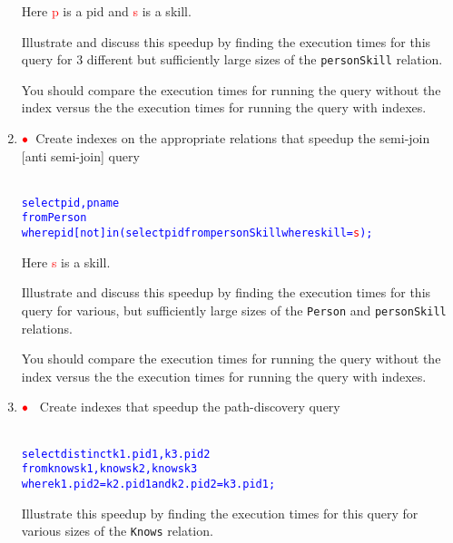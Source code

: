 \documentclass{article}
\newcommand{\redbullet}{$\textcolor{red}{\bullet}$}
\newcommand{\red}[1]{\textcolor{red}#1}
\begin{document}
\begin{enumerate}[resume]
Here \textcolor{red}{p} is a pid and \textcolor{red}{s} is a skill.

Illustrate and discuss this speedup by finding the execution times for this query for  
3 different but sufficiently large sizes of the {\tt personSkill} relation.

You should compare the execution times for running the query without the index versus the
the execution times for running the query with indexes.

\item \redbullet\  Create indexes on the appropriate relations that speedup the semi-join [anti semi-join] query
\begin{alltt}\textcolor{blue}{
select pid, pname 
from   Person 
where  pid [not] in (select pid from personSkill where skill = \red{s});}
\end{alltt}

Here \textcolor{red}{s} is a skill.

Illustrate and discuss this speedup by finding the execution times for this query for 
various, but sufficiently large sizes of the {\tt Person} and {\tt personSkill} relations.

You should compare the execution times for running the query without the index versus the
the execution times for running the query with indexes.

\item \redbullet\ %
Create indexes that speedup the path-discovery query
\begin{alltt}\textcolor{blue}{
select distinct k1.pid1, k3.pid2
from   knows k1, knows k2, knows k3 
where  k1.pid2 = k2.pid1 and k2.pid2 = k3.pid1;}
\end{alltt}
Illustrate this speedup by finding the execution times for this query for various sizes of the {\tt Knows} relation.
\end{enumerate}
\end{document}
